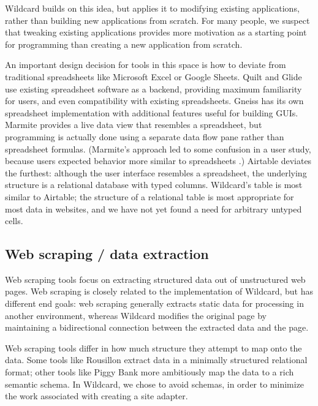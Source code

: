 \documentclass[english,submission]{programming}
\begin{document}
Wildcard builds on this idea, but applies it to modifying existing
applications, rather than building new applications from scratch. For
many people, we suspect that tweaking existing applications provides
more motivation as a starting point for programming than creating a new
application from scratch.

An important design decision for tools in this space is how to deviate
from traditional spreadsheets like Microsoft Excel or Google Sheets.
Quilt and Glide use existing spreadsheet software as a backend,
providing maximum familiarity for users, and even compatibility with
existing spreadsheets. Gneiss has its own spreadsheet implementation
with additional features useful for building GUIs. Marmite provides a
live data view that resembles a spreadsheet, but programming is actually
done using a separate data flow pane rather than spreadsheet formulas.
(Marmite's approach led to some confusion in a user study, because users
expected behavior more similar to spreadsheets \autocite{wong2007}.)
Airtable deviates the furthest: although the user interface resembles a
spreadsheet, the underlying structure is a relational database with
typed columns. Wildcard's table is most similar to Airtable; the
structure of a relational table is most appropriate for most data in
websites, and we have not yet found a need for arbitrary untyped cells.

\hypertarget{web-scraping-data-extraction}{%
\subsection{Web scraping / data
extraction}\label{web-scraping-data-extraction}}

Web scraping tools focus on extracting structured data out of
unstructured web pages. Web scraping is closely related to the
implementation of Wildcard, but has different end goals: web scraping
generally extracts static data for processing in another environment,
whereas Wildcard modifies the original page by maintaining a
bidirectional connection between the extracted data and the page.

Web scraping tools differ in how much structure they attempt to map onto
the data. Some tools like Rousillon \autocite{chasins2018} extract data
in a minimally structured relational format; other tools like Piggy Bank
\autocite{huynh2005} more ambitiously map the data to a rich semantic
schema. In Wildcard, we chose to avoid schemas, in order to minimize the
work associated with creating a site adapter.
\end{document}
